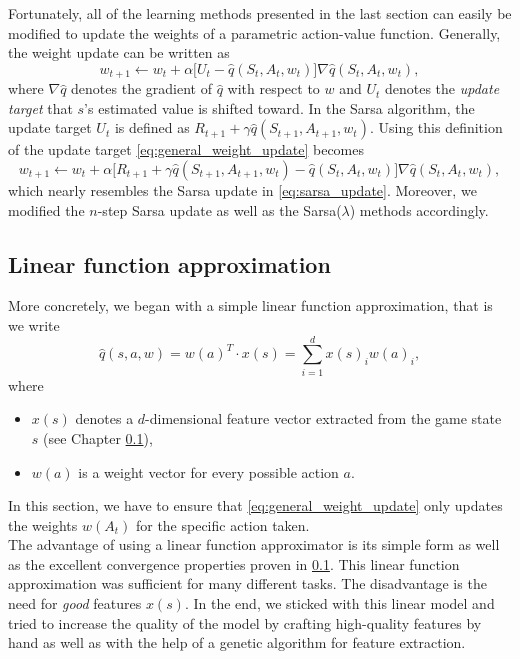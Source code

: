 Fortunately, all of the learning methods presented in the last section can easily be modified to update the weights of a parametric action-value function. Generally, the weight update can be written as
\begin{equation} \label{eq:general_weight_update}
	w_{t+1} \leftarrow w_t + \alpha \big[U_t - \hat q(S_t, A_t, w_t)\big]\nabla \hat q(S_t, A_t, w_t),
\end{equation}
where $\nabla \hat q$ denotes the gradient of $\hat q$ with respect to $w$ and $U_t$ denotes the \emph{update target} that $s$’s estimated value is shifted toward. In the Sarsa algorithm, the update target $U_t$ is defined as $R_{t+1} + \gamma \hat q(S_{t+1}, A_{t+1}, w_{t})$. Using this definition of the update target \ref{eq:general_weight_update} becomes
\begin{equation*}
	w_{t+1} \leftarrow w_t + \alpha \big[R_{t+1} + \gamma \hat q(S_{t+1}, A_{t+1}, w_t) - \hat q(S_t, A_t, w_t)\big]\nabla \hat q(S_t, A_t, w_t),
\end{equation*}
which nearly resembles the Sarsa update in \eqref{eq:sarsa_update}. Moreover, we modified the $n$-step Sarsa update as well as the Sarsa($\lambda$) methods accordingly. \\

\subsection{Linear function approximation}

More concretely, we began with a simple linear function approximation, that is we write
\begin{equation*}
	\hat q(s, a, w) = w(a)^T \cdot x(s) = \sum_{i=1}^d x(s)_i w(a)_i,
\end{equation*}
where
\begin{itemize}
	\item $x(s)$ denotes a $d$-dimensional feature vector extracted from the game state $s$ (see Chapter \ref{}), 
	\item $w(a)$ is a weight vector for every possible action $a$.
\end{itemize}
In this section, we have to ensure that \eqref{eq:general_weight_update} only updates the weights $w(A_t)$ for the specific action taken. \\

The advantage of using a linear function approximator is its simple form as well as the excellent convergence properties proven in \ref{}. This linear function approximation was sufficient for many different tasks. The disadvantage is the need for \emph{good} features $x(s)$. In the end, we sticked with this linear model and tried to increase the quality of the model by crafting high-quality features by hand as well as with the help of a genetic algorithm for feature extraction. 







